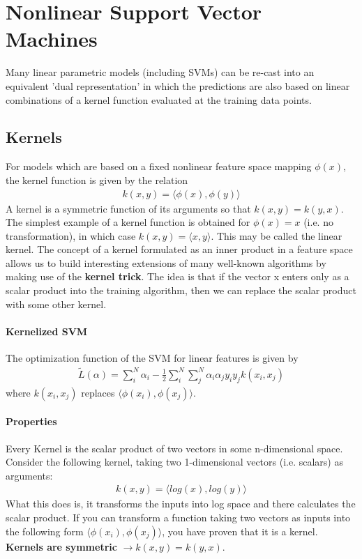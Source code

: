 \documentclass[main]{subfiles}
\begin{document}

\section{Nonlinear Support Vector Machines}
Many linear parametric models (including SVMs) can be  re-cast into an equivalent 'dual representation' in which the predictions are also based on linear combinations of a kernel function evaluated at the training data points. 
\subsection{Kernels}
For models which are based on a fixed nonlinear feature space mapping $\phi(x)$, the kernel function is given by the relation
\begin{align}
k(x,y)=\langle \phi(x), \phi(y) \rangle
\end{align}
A kernel is a symmetric function of its arguments so that $k(x,y)=k(y,x)$. The simplest example of a kernel function is obtained for $\phi(x)=x$ (i.e. no transformation), in which case $k(x,y)=\langle x,y \rangle$. This may be called the linear kernel. The concept of a kernel formulated as an inner product in a feature space allows us to build interesting extensions of many well-known algorithms by making use of the \textbf{kernel trick}. The idea is that if the vector x enters only as a scalar product into the training algorithm, then we can replace the scalar product with some other kernel. 
\paragraph{Kernelized SVM} The optimization function of the SVM for linear features is given by 
\begin{align}
\tilde{L}(\alpha)=\sum_i^N \alpha_i - \frac{1}{2} \sum_i^N \sum_j^N \alpha_i \alpha_j y_i y_j k(x_i, x_j)
\end{align}
where $k(x_i, x_j)$ replaces $\langle \phi(x_i), \phi(x_j)\rangle$.
\paragraph{Properties}
Every Kernel is the scalar product of two vectors in some n-dimensional space. Consider the following kernel, taking two 1-dimensional vectors (i.e. scalars) as arguments: 
\begin{align}
k(x,y)=\langle log(x), log(y) \rangle
\end{align}
What this does is, it transforms the inputs into log space and there calculates the scalar product. If you can transform a function taking two vectors as inputs into the following form $\langle \phi(x_i), \phi(x_j)\rangle$, you have proven that it is a kernel. \textbf{Kernels are symmetric} $\rightarrow k(x,y)=k(y,x)$.
\end{document}
